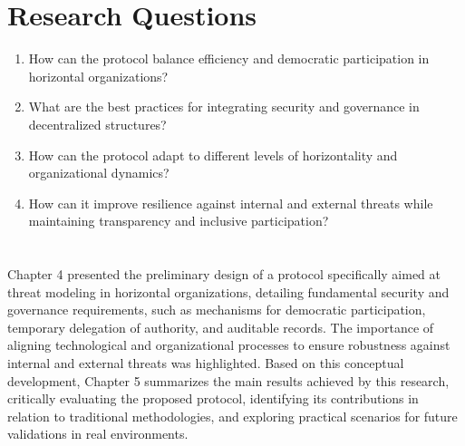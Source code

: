 \section{Research Questions}
\label{sec:research_questions}

\begin{enumerate}
    \item How can the protocol balance efficiency and democratic participation
in horizontal organizations?
    \item What are the best practices for integrating security and governance
in decentralized structures?
    \item How can the protocol adapt to different levels of horizontality and
organizational dynamics?
    \item How can it improve resilience against internal and external threats
while maintaining transparency and inclusive participation?
\end{enumerate}

\section*{}
Chapter 4 presented the preliminary design of a protocol specifically aimed at
threat modeling in horizontal organizations, detailing fundamental security and
governance requirements, such as mechanisms for democratic participation,
temporary delegation of authority, and auditable records. The importance of
aligning technological and organizational processes to ensure robustness against
internal and external threats was highlighted. Based on this conceptual
development, Chapter 5 summarizes the main results achieved by this research,
critically evaluating the proposed protocol, identifying its contributions in
relation to traditional methodologies, and exploring practical scenarios for
future validations in real environments.
